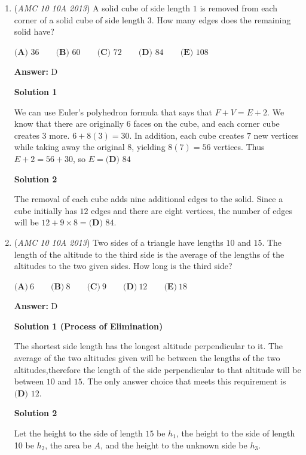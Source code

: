 \begin{enumerate}
	\item (\textit{AMC 10 10A 2013}) A solid cube of side length $1$ is removed from each corner of a solid cube of side length $3$.  How many edges does the remaining solid have?


 $\textbf{(A) }36\qquad\textbf{(B) }60\qquad\textbf{(C) }72\qquad\textbf{(D) }84\qquad\textbf{(E) }108\qquad$

 \textbf{Answer: }D



\textbf{Solution 1}

We can use Euler's polyhedron formula that says that $F+V=E+2$.  We know that there are originally $6$ faces on the cube, and each corner cube creates $3$ more.  $6+8(3) = 30$.  In addition, each cube creates $7$ new vertices while taking away the original $8$, yielding $8(7) = 56$ vertices.  Thus $E+2=56+30$, so $E=\boxed{\textbf{(D) }84}$




\textbf{Solution 2}

The removal of each cube adds nine additional edges to the solid. Since a cube initially has $12$ edges and there are eight vertices, the number of edges will be $12 + 9 \times 8 = \boxed{\textbf{(D) } 84}$.

 


	\item (\textit{AMC 10 10A 2013}) Two sides of a triangle have lengths $10$ and $15$.  The length of the altitude to the third side is the average of the lengths of the altitudes to the two given sides.  How long is the third side?


 $\textbf{(A)}\ 6 \qquad\textbf{(B)}\ 8 \qquad\textbf{(C)}\ 9 \qquad\textbf{(D)}\ 12 \qquad\textbf{(E)}\ 18$

 \textbf{Answer: }D



\textbf{Solution 1 (Process of Elimination)}

The shortest side length has the longest altitude perpendicular to it. The average of the two altitudes given will be between the lengths of the two altitudes,therefore the length of the side perpendicular to that altitude will be between $10$ and $15$. The only answer choice that meets this requirement is $\boxed{\textbf{(D) }12}$.\textbf{}

 



\textbf{Solution 2}

\textbf{}Let the height to the side of length $15$ be $h_{1}$, the height to the side of length 10 be $h_{2}$, the area be $A$, and the height to the unknown side be $h_{3}$.


\end{enumerate}
